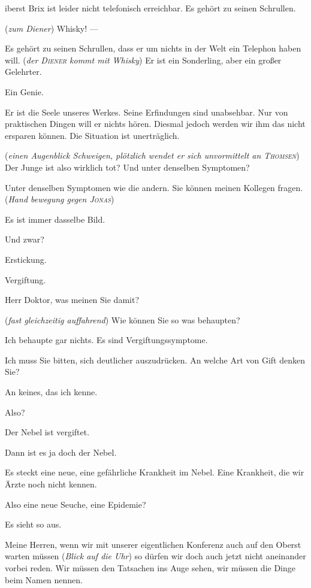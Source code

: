 \documentclass[
	final,
	a4paper,
	ngerman,
	mpinclude = true, %
	twoside = true,
	open = right,
	cleardoublepage = plain,
	DIV = 13,
	BCOR = 1cm,
	titlepage = firstiscover,
	]{scrbook}
\newcommand{\direction}[1]{(\textit{#1})}
\newcommand{\thecharacter}[1]{\textup{\textsc{#1}}\xspace}
\newcommand{\theAlexis}{\thecharacter{Alexis}}
\newcommand{\theThomsen}{\thecharacter{Thomsen}}
\newcommand{\theJonas}{\thecharacter{Jonas}}
\newcommand{\theDiener}{\thecharacter{Diener}}
\newcommand{\character}[1]{\item[#1]}
\newcommand{\Generaldirektor}{\character{Direktor}}
\newcommand{\Alexis}{\character{\theAlexis}}
\newcommand{\Thomsen}{\character{\theThomsen}}
\newcommand{\Jonas}{\character{\theJonas}}
\begin{document}
\begin{play}
iberst Brix ist leider nicht telefonisch erreichbar. Es gehört zu seinen Schrullen.

\direction{zum Diener} Whisky! ---

Es gehört zu seinen Schrullen, dass er um nichts in der Welt ein Telephon haben will. \direction{der \theDiener kommt mit Whisky} Er ist ein Sonderling, aber ein großer Gelehrter.

\Alexis
Ein Genie.

\Generaldirektor
Er ist die Seele unseres Werkes. Seine Erfindungen sind unabsehbar. Nur von praktischen Dingen will er nichts hören. Diesmal jedoch werden wir ihm das nicht ersparen können. Die Situation ist unerträglich.

\direction{einen Augenblick Schweigen, plötzlich wendet er sich unvormittelt an \theThomsen} Der Junge ist also wirklich tot? Und unter denselben Symptomen?

\Thomsen
Unter denselben Symptomen wie die andern. Sie können meinen Kollegen fragen. \direction{Hand bewegung gegen \theJonas}

\Jonas
Es ist immer dasselbe Bild.

\Generaldirektor
Und zwar?

\Thomsen
Erstickung.

\Jonas
Vergiftung.

\Generaldirektor
Herr Doktor, was meinen Sie damit?

\Alexis
\direction{fast gleichzeitig auffahrend} Wie können Sie so was behaupten?

\Jonas
Ich behaupte gar nichts. Es sind Vergiftungssymptome.

\Generaldirektor
Ich muss Sie bitten, sich deutlicher auszudrücken. An welche Art von Gift denken Sie?

\Jonas
An keines, das ich kenne.

\Generaldirektor
Also?

\Thomsen
Der Nebel ist vergiftet.

\Alexis
Dann ist es ja doch der Nebel.

\Thomsen
Es steckt eine neue, eine gefährliche Krankheit im Nebel. Eine Krankheit, die wir Ärzte noch nicht kennen.

\Alexis
Also eine neue Seuche, eine Epidemie?

\Thomsen
Es sieht so aus.

\Generaldirektor
Meine Herren, wenn wir mit unserer eigentlichen Konferenz auch auf den Oberst warten müssen \direction{Blick auf die Uhr} so dürfen wir doch auch jetzt nicht aneinander vorbei reden. Wir müssen den Tatsachen ins Auge sehen, wir müssen die Dinge beim Namen nennen.


\end{play}
\end{document}

